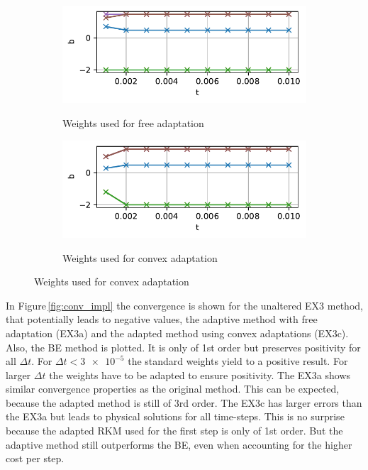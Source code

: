 \documentclass[a4paper]{article}
\numberwithin{equation}{section}
\theoremstyle{plain}
\theoremstyle{definition}
\numberwithin{theorem}{section}
\newcommand{\dt}{{\Delta t}}
\newcommand{\1}{\mathbbm{1}}
\begin{document}
\begin{figure}
\begin{subfigure}[b]{0.45\textwidth}
\includegraphics[width=1\textwidth]{plots/b_Diff_Direct.pdf}\\
\caption{Weights used for free adaptation}
\label{fig:weights_Diff_a}
\end{subfigure}
\begin{subfigure}[b]{0.45\textwidth}
\includegraphics[width=1\textwidth]{plots/b_Diff_Convex.pdf}\\
\caption{Weights used for convex adaptation}
\label{fig:weights_Diff_c}
\end{subfigure}
\end{figure}


In Figure\,\ref{fig:conv_impl} the convergence is shown for the unaltered EX3 method, that potentially leads to negative values, the adaptive method with free adaptation (EX3a) and the adapted method using convex adaptations (EX3c).  
Also, the BE method is plotted. It is only of 1st order but preserves positivity for all $\dt$. 
For $\dt < \num{3e-5} $ the standard weights yield to a positive result. For larger $\dt$ the weights have to be adapted to ensure positivity. 
The EX3a shows similar convergence properties as the original method. 
This can be expected, because the adapted method is still of 3rd order. 
The EX3c has larger errors than the EX3a but leads to physical solutions for all time-steps.  
This is no surprise because the adapted RKM used for the first step is only of 1st order. 
But the adaptive method still outperforms the BE, even when accounting for the higher cost per step. 
\end{document}
